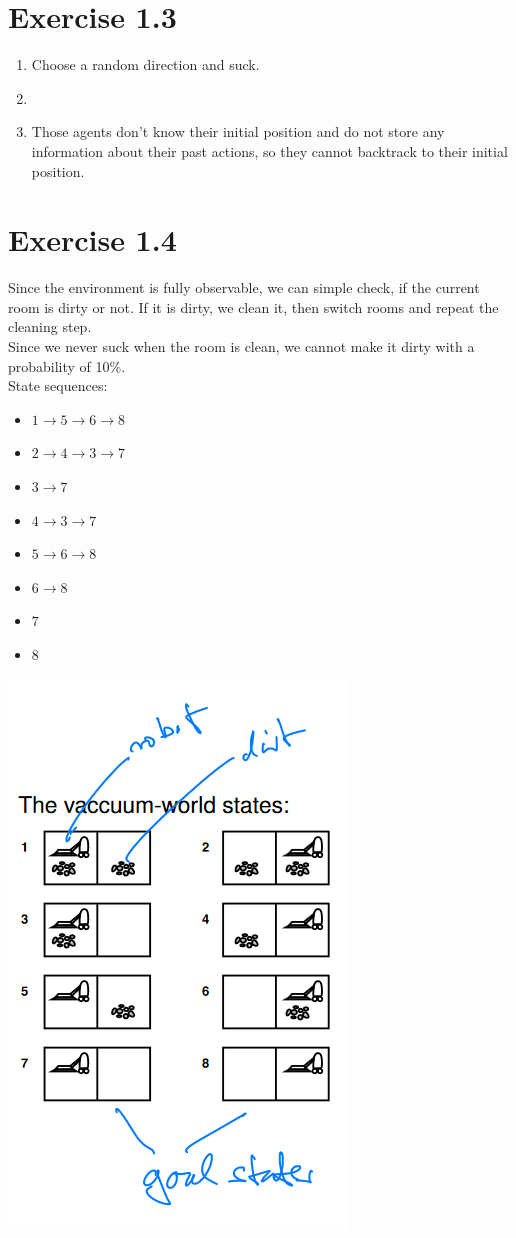 \documentclass{article}
\begin{document}
\section*{Exercise 1.3}
\begin{enumerate}[label=(\alph*)]
	\item	Choose a random direction and suck.
	\item
	\item	Those agents don't know their initial position and do not store any information about their past actions, so they cannot backtrack to their initial position.
\end{enumerate}

\section*{Exercise 1.4}
Since the environment is fully observable, we can simple check, if the current room is dirty or not. If it is dirty, we clean it, then switch rooms and repeat the cleaning step.\\
Since we never suck when the room is clean, we cannot make it dirty with a probability of 10\%.\\
State sequences:
\begin{itemize}
	\item	$1 \rightarrow 5 \rightarrow 6 \rightarrow 8$
	\item	$2 \rightarrow 4 \rightarrow 3 \rightarrow 7$
	\item	$3 \rightarrow 7$
	\item	$4 \rightarrow 3 \rightarrow 7$
	\item	$5 \rightarrow 6 \rightarrow 8$
	\item	$6 \rightarrow 8$
	\item	$7$
	\item	$8$
\end{itemize}

\includegraphics{1.4.png}
\end{document}

